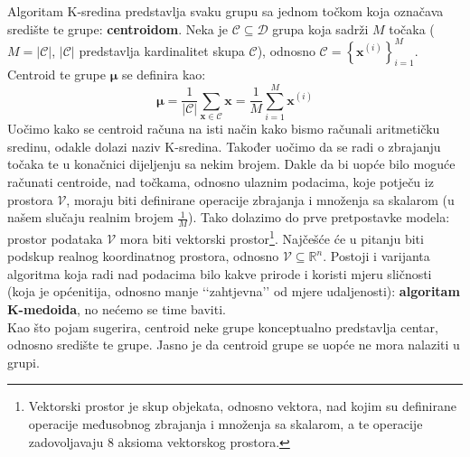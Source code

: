 \documentclass[times, utf8, zavrsni]{fer}
\begin{document}
Algoritam K-sredina predstavlja svaku grupu sa jednom točkom koja označava središte te grupe: \textbf{centroidom}. Neka je $\mathcal{C} \subseteq \mathcal{D}$ grupa koja sadrži $M$ točaka ($M = \vert \mathcal{C} \vert$, $\vert \mathcal{C} \vert$ predstavlja kardinalitet skupa $\mathcal{C}$), odnosno 
$\mathcal{C} = \left\{ \mathbf{x}^{(i)}  \right\}_{i=1}^{M}$.
Centroid te grupe $\boldsymbol{\mu}$ se definira kao:
\[\boldsymbol{\mu} = \frac{1}{\vert \mathcal{C} \vert} \sum_{\mathbf{x} \in \mathcal{C}} \mathbf{x} = 
\frac{1}{M} \sum_{i=1}^{M} \mathbf{x}^{(i)}\]
Uočimo kako se centroid računa na isti način kako bismo računali aritmetičku sredinu, odakle dolazi naziv K-sredina. Također uočimo da se radi o zbrajanju točaka te u konačnici dijeljenju sa nekim brojem. Dakle da bi uopće bilo moguće računati centroide, nad točkama, odnosno ulaznim podacima, koje potječu iz prostora $\mathcal{V}$, moraju biti definirane operacije zbrajanja i množenja sa skalarom (u našem slučaju realnim brojem $\frac{1}{M}$). Tako dolazimo do prve pretpostavke modela: prostor podataka $\mathcal{V}$ mora biti vektorski prostor\footnote{Vektorski prostor je skup objekata, odnosno vektora, nad kojim su definirane operacije međusobnog zbrajanja i množenja sa skalarom, a te operacije zadovoljavaju 8 aksioma vektorskog prostora.}. Najčešće će u pitanju biti podskup realnog koordinatnog prostora, odnosno $\mathcal{V} \subseteq \mathbb{R}^n$. 
Postoji i varijanta algoritma koja radi nad podacima bilo kakve prirode i koristi mjeru sličnosti (koja je općenitija, odnosno manje ‘‘zahtjevna’’ od mjere udaljenosti): \textbf{algoritam K-medoida}, no nećemo se time baviti.\\
Kao što pojam sugerira, centroid neke grupe konceptualno predstavlja centar, odnosno središte te grupe. Jasno je da centroid grupe se uopće ne mora nalaziti u grupi.
\end{document}
